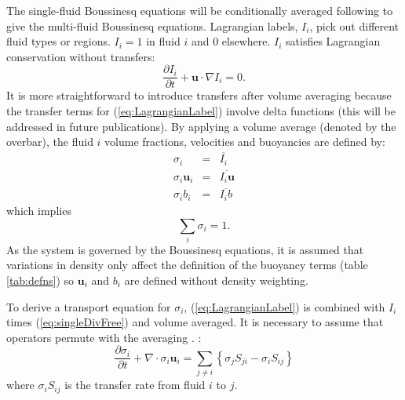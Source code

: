 \documentclass[draft]{agujournal2019}
\begin{document}
The single-fluid Boussinesq equations will be conditionally averaged following  to give the multi-fluid Boussinesq equations. Lagrangian labels, $I_i$, pick out different fluid types or regions. $I_i=1$ in fluid $i$ and 0 elsewhere. $I_i$ satisfies Lagrangian conservation without transfers:
\begin{equation}
\frac{\partial I_i}{\partial t} + \mathbf{u}\cdot\nabla I_i = 0.
\label{eq:LagrangianLabel}
\end{equation}
It is more straightforward to introduce transfers after volume averaging because the transfer terms for (\ref{eq:LagrangianLabel}) involve delta functions (this will be addressed in future publications). 
By applying a volume average (denoted by the overbar), the fluid $i$ volume fractions, velocities and buoyancies are defined by:
\begin{eqnarray}
\sigma_i &=& \overline{I_i} \\
\sigma_i \mathbf{u}_i &=& \overline{I_i \mathbf{u}} \\
\sigma_i b_i &=& \overline{I_i b}
\label{eq:defineFluidFields}
\end{eqnarray}
which implies
\begin{equation}
\sum_{i}\sigma_{i}  =  1.
\label{eq:sumOne}
\end{equation}
As the system is governed by the Boussinesq equations, it is assumed that variations in density only affect the definition of the buoyancy terms (table \protect\ref{tab:defns}) so $\mathbf{u}_i$ and $b_i$ are defined without density weighting. 

To derive a transport equation for $\sigma_i$, (\ref{eq:LagrangianLabel}) is combined with $I_i$ times (\ref{eq:singleDivFree}) and volume averaged. 
It is necessary to assume that operators permute with the averaging \cite<as described by>{TWV+18}.   :
\begin{equation}
\frac{\partial\sigma_{i}}{\partial t}+\nabla\cdot\sigma_{i}\mathbf{u}_{i}  =  \sum_{j\ne i}\left\{ \sigma_{j}S_{ji}-\sigma_{i}S_{ij}\right\}
\label{eq:sigma}
\end{equation}
where $\sigma_{i}S_{ij}$ is the transfer rate from fluid $i$ to $j$.
\end{document}
